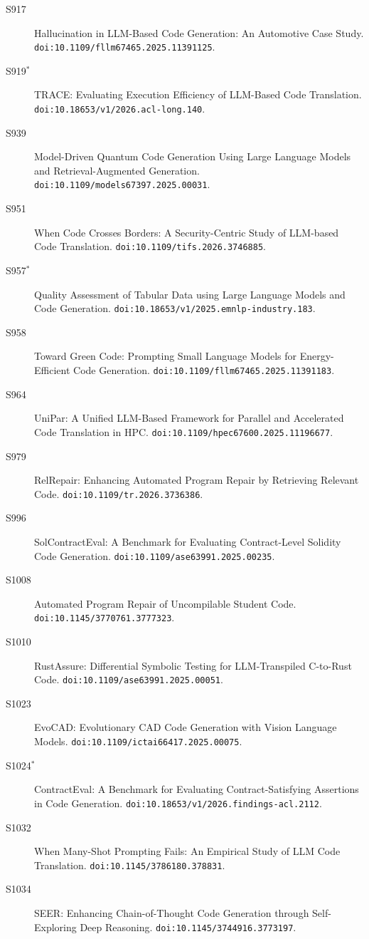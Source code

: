 {\begin{description}
\item[S917] Hallucination in LLM-Based Code Generation: An Automotive Case Study. \texttt{doi:10.1109/fllm67465.2025.11391125}.
\item[S919$^\ast$] TRACE: Evaluating Execution Efficiency of LLM-Based Code Translation. \texttt{doi:10.18653/v1/2026.acl-long.140}.
\item[S939] Model-Driven Quantum Code Generation Using Large Language Models and Retrieval-Augmented Generation. \texttt{doi:10.1109/models67397.2025.00031}.
\item[S951] When Code Crosses Borders: A Security-Centric Study of LLM-based Code Translation. \texttt{doi:10.1109/tifs.2026.3746885}.
\item[S957$^\ast$] Quality Assessment of Tabular Data using Large Language Models and Code Generation. \texttt{doi:10.18653/v1/2025.emnlp-industry.183}.
\item[S958] Toward Green Code: Prompting Small Language Models for Energy-Efficient Code Generation. \texttt{doi:10.1109/fllm67465.2025.11391183}.
\item[S964] UniPar: A Unified LLM-Based Framework for Parallel and Accelerated Code Translation in HPC. \texttt{doi:10.1109/hpec67600.2025.11196677}.
\item[S979] RelRepair: Enhancing Automated Program Repair by Retrieving Relevant Code. \texttt{doi:10.1109/tr.2026.3736386}.
\item[S996] SolContractEval: A Benchmark for Evaluating Contract-Level Solidity Code Generation. \texttt{doi:10.1109/ase63991.2025.00235}.
\item[S1008] Automated Program Repair of Uncompilable Student Code. \texttt{doi:10.1145/3770761.3777323}.
\item[S1010] RustAssure: Differential Symbolic Testing for LLM-Transpiled C-to-Rust Code. \texttt{doi:10.1109/ase63991.2025.00051}.
\item[S1023] EvoCAD: Evolutionary CAD Code Generation with Vision Language Models. \texttt{doi:10.1109/ictai66417.2025.00075}.
\item[S1024$^\ast$] ContractEval: A Benchmark for Evaluating Contract-Satisfying Assertions in Code Generation. \texttt{doi:10.18653/v1/2026.findings-acl.2112}.
\item[S1032] When Many-Shot Prompting Fails: An Empirical Study of LLM Code Translation. \texttt{doi:10.1145/3786180.378831}.
\item[S1034] SEER: Enhancing Chain-of-Thought Code Generation through Self-Exploring Deep Reasoning. \texttt{doi:10.1145/3744916.3773197}.

\end{description}}
